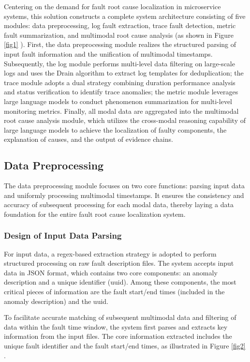 \documentclass[10pt]{article}
\let\oldref\ref
\renewcommand{\ref}[1]{%
    \textcolor{blue}{\oldref{#1}}%
}
\begin{document}
Centering on the demand for fault root cause localization in microservice systems, this solution constructs a complete system architecture consisting of five modules: data preprocessing, log fault extraction, trace fault detection, metric fault summarization, and multimodal root cause analysis (as shown in Figure \ref{fig1}). First, the data preprocessing module realizes the structured parsing of input fault information and the unification of multimodal timestamps. Subsequently, the log module performs multi-level data filtering on large-scale logs and uses the Drain algorithm to extract log templates for deduplication; the trace module adopts a dual strategy combining duration performance analysis and status verification to identify trace anomalies; the metric module leverages large language models to conduct phenomenon summarization for multi-level monitoring metrics. Finally, all modal data are aggregated into the multimodal root cause analysis module, which utilizes the cross-modal reasoning capability of large language models to achieve the localization of faulty components, the explanation of causes, and the output of evidence chains.


\subsection{Data Preprocessing}

The data preprocessing module focuses on two core functions: parsing input data and uniformly processing multimodal timestamps. It ensures the consistency and accuracy of subsequent processing for each modal data, thereby laying a data foundation for the entire fault root cause localization system.

\subsubsection{Design of Input Data Parsing}

For input data, a regex-based extraction strategy is adopted to perform structured processing on raw fault description files. The system accepts input data in JSON format, which contains two core components: an anomaly description and a unique identifier (uuid). Among these components, the most critical pieces of information are the fault start/end times (included in the anomaly description) and the uuid.

To facilitate accurate matching of subsequent multimodal data and filtering of data within the fault time window, the system first parses and extracts key information from the input files. The core information extracted includes the unique fault identifier and the fault start/end times, as illustrated in Figure \ref{fig2}.
\end{document}
